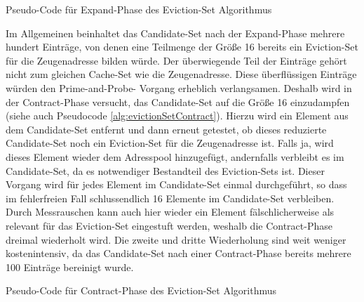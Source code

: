 \begin{algorithm}[h]
\DontPrintSemicolon
\caption{Pseudo-Code für Expand-Phase des Eviction-Set Algorithmus}
\label{alg:evictionSetExpand}

\end{algorithm}

Im Allgemeinen beinhaltet das Candidate-Set nach der Expand-Phase mehrere hundert Einträge, von denen eine Teilmenge der Größe 16 bereits ein Eviction-Set für die Zeugenadresse bilden würde. 
Der überwiegende Teil der Einträge gehört nicht zum gleichen Cache-Set wie die Zeugenadresse.
Diese überflüssigen Einträge würden den Prime-and-Probe- Vorgang erheblich verlangsamen. Deshalb wird in der Contract-Phase versucht, das Candidate-Set auf die Größe 16 einzudampfen (siehe auch Pseudocode \ref{alg:evictionSetContract}).
Hierzu wird ein Element aus dem Candidate-Set entfernt und dann erneut getestet, ob dieses reduzierte Candidate-Set noch ein Eviction-Set für die Zeugenadresse ist.
Falls ja, wird dieses Element wieder dem Adresspool hinzugefügt, andernfalls verbleibt es im Candidate-Set, da es notwendiger Bestandteil des Eviction-Sets ist.
Dieser Vorgang wird für jedes Element im Candidate-Set einmal durchgeführt, so dass im fehlerfreien Fall schlussendlich 16 Elemente im Candidate-Set verbleiben.
Durch Messrauschen kann auch hier wieder ein Element fälschlicherweise als relevant für das Eviction-Set eingestuft werden, weshalb die Contract-Phase dreimal wiederholt wird.
Die zweite und dritte Wiederholung sind weit weniger kostenintensiv, da das Candidate-Set nach einer Contract-Phase bereits mehrere 100 Einträge bereinigt wurde.

\begin{algorithm}[h]
\DontPrintSemicolon
\caption{Pseudo-Code für Contract-Phase des Eviction-Set Algorithmus}
\label{alg:evictionSetContract}
\end{algorithm}

